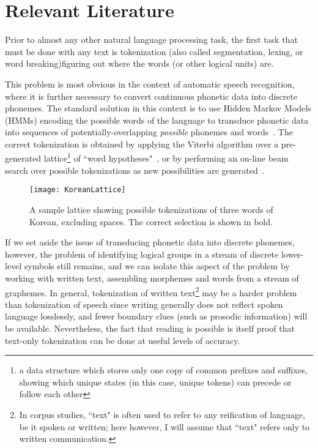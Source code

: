 \chapter{Relevant Literature}

Prior to almost any other natural language processing task, the first task that must be done with any text is tokenization (also called segmentation, lexing, or word breaking)\textemdash figuring out where the words (or other logical units) are. 

This problem is most obvious in the context of automatic speech recognition, where it is further necessary to convert continuous phonetic data into discrete phonemes. The standard solution in this context is to use Hidden Markov Models (HMMs) encoding the possible words of the language to transduce phonetic data into sequences of potentially-overlapping \textit{possible} phonemes and words~\cite{varile97}. The correct tokenization is obtained by applying the Viterbi algorithm over a pre-generated lattice\footnote{a data structure which stores only one copy of common prefixes and suffixes, showing which unique states (in this case, unique tokens) can precede or follow each other} of ``word hypotheses"~\cite{aubert94}, or by performing an on-line beam search over possible tokenizations as new possibilities are generated~\cite{paul94}.

\begin{figure}
	\centering
	\texttt{[image: KoreanLattice]}
	\caption[Token Lattice]{A sample lattice showing possible tokenizations of three words of Korean, excluding spaces. The correct selection is shown in bold.}
	\label{latticediagram}
\end{figure}

If we set aside the issue of transducing phonetic data into discrete phonemes, however, the problem of identifying logical groups in a stream of discrete lower-level symbols still remains, and we can isolate this aspect of the problem by working with written text, assembling morphemes and words from a stream of graphemes. In general, tokenization of written text\footnote{In corpus studies, ``text" is often used to refer to any reification of language, be it spoken or written; here however, I will assume that ``text" refers only to written communication.} may be a harder problem than tokenization of speech since writing generally does not reflect spoken language losslessly, and fewer boundary clues (such as prosodic information) will be available. Nevertheless, the fact that reading is possible is itself proof that text-only tokenization can be done at useful levels of accuracy.

